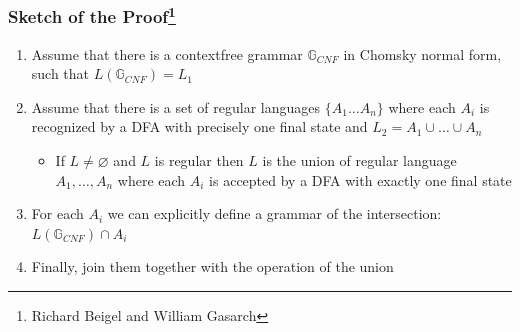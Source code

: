 \documentclass[xcolor=table]{beamer}
\begin{document}
\begin{frame} \frametitle{Sketch of the Proof\footnote{Richard Beigel and William Gasarch}}
\begin{enumerate}
  \item Assume that there is a contextfree grammar $\mathbb{G}_{CNF}$ in Chomsky normal form, such that $L(\mathbb{G}_{CNF}) = L_1$
  \pause
  \item Assume that there is a set of regular languages $\{A_1 \ldots A_n\}$ where each $A_i$ is recognized by a DFA with precisely one final state and $L_2 = A_1 \cup \ldots \cup A_n$
  \pause
  \begin{itemize}
    \item If $ L \neq \varnothing $ and $L$ is regular then $L$ is the union of regular language $A_1, \ldots , A_n$ where each $A_i$ is accepted by a DFA with exactly one final state
  \end{itemize}
  \pause
  \item For each $A_i$ we can explicitly define a grammar of the intersection: $L(\mathbb{G}_{CNF}) \cap A_i$
  \pause
  \item Finally, join them together with the operation of the union
\end{enumerate}

\end{frame}
\end{document}
